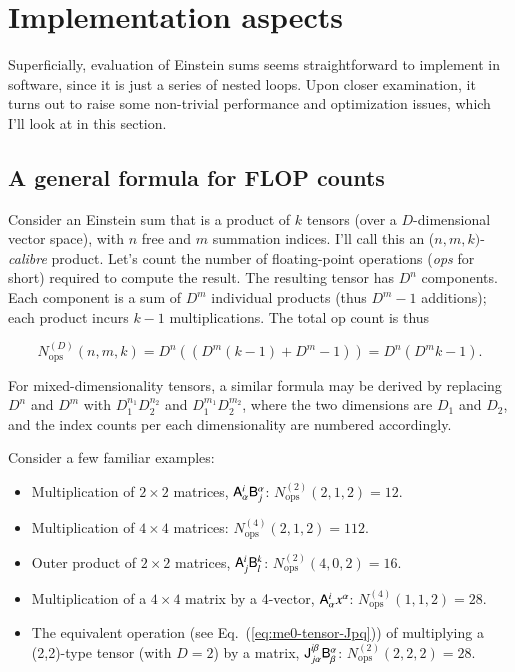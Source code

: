 \documentclass[]{aa}
\begin{document}
\section{Implementation aspects}

Superficially, evaluation of Einstein sums seems straightforward to implement in software, since it is just a series of nested loops.
Upon closer examination, it turns out to raise some non-trivial performance and optimization issues, which I'll look at in this section.

\subsection{A general formula for FLOP counts}

Consider an Einstein sum that is a product of $k$ tensors (over a $D$-dimensional vector space), with $n$ free and $m$ summation indices. I'll call this an ($n,m,k)$-\emph{calibre\/} product. Let's count the number of floating-point operations (\emph{ops\/} for short) required to compute the result. The resulting tensor has $D^n$ components. Each component is a sum of $D^m$ individual products (thus $D^m-1$ additions); each product incurs $k-1$ multiplications. The total op count is thus 

\begin{equation}
N_\mathrm{ops}^{(D)}(n,m,k) = D^n((D^m(k-1)+D^m-1)) = D^n(D^m k -1 ).
\end{equation}

For mixed-dimensionality tensors, a similar formula may be derived by replacing $D^n$ and $D^m$ with $D_1^{n_1}D_2^{n_2}$ and $D_1^{m_1}D_2^{m_2}$, where the two dimensions are $D_1$ and $D_2$, and the index counts per each dimensionality are numbered accordingly.

Consider a few familiar examples:

\begin{itemize}
\item Multiplication of $2\times2$ matrices, $\mathsf{A}^i_\alpha\mathsf{B}^\alpha_j$: $N_\mathrm{ops}^{(2)}(2,1,2)=12$.
\item Multiplication of $4\times4$ matrices: $N_\mathrm{ops}^{(4)}(2,1,2)=112$.
\item Outer product of $2\times2$ matrices, $\mathsf{A}^i_j\mathsf{B}^k_l$:  $N_\mathrm{ops}^{(2)}(4,0,2)=16$.
\item Multiplication of a $4\times4$ matrix by a 4-vector, $\mathsf{A}^i_\alpha x^\alpha$:  $N_\mathrm{ops}^{(4)}(1,1,2)=28$.
\item The equivalent operation (see Eq.~(\ref{eq:me0-tensor-Jpq})) of multiplying a (2,2)-type tensor (with $D=2$) by a matrix, 
$\mathsf{J}^{i\beta}_{j\alpha}\mathsf{B}^\alpha_\beta$: $N_\mathrm{ops}^{(2)}(2,2,2)=28$.

\end{itemize}
\end{document}
